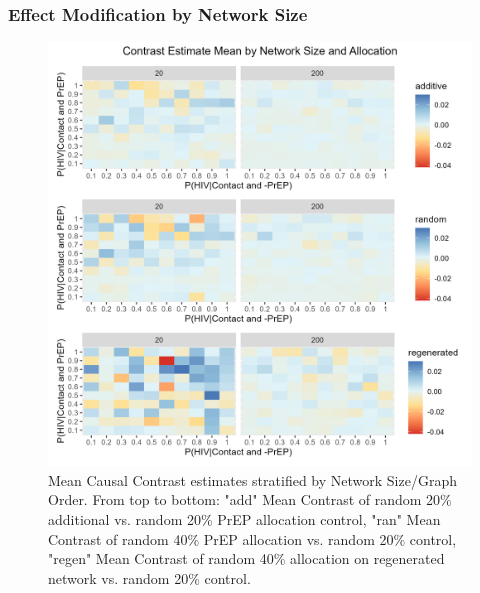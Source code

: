 \documentclass{article}
\theoremstyle{definition}
\begin{document}
\subsubsection{Effect Modification by Network Size}
\begin{figure}[H]
    \centering
    \includegraphics[scale=0.8]{Figures/Network Size Mean Plot.png}
    \caption{Mean Causal Contrast estimates stratified by Network Size/Graph Order. From top to bottom: "add" Mean Contrast of random 20\% additional vs. random 20\% PrEP allocation control, "ran" Mean Contrast of random 40\% PrEP allocation vs. random 20\% control, "regen" Mean Contrast of random 40\% allocation on regenerated network vs. random 20\% control. }
    \label{fig:Figure 7}
\end{figure}
\end{document}
